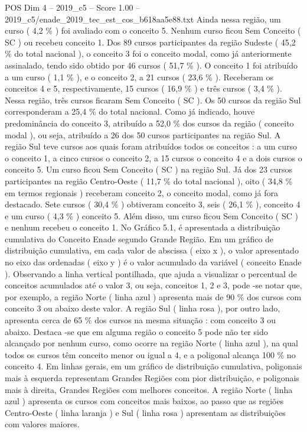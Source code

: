 \begin{textsample}{POS Dim 4 – 2019\_c5 – Score 1.00 – 2019\_c5/enade\_2019\_tec\_est\_cos\_b618aa5e88.txt}
Ainda nessa região, um curso ( 4,2 \% ) foi avaliado com o conceito 5.
Nenhum curso ficou Sem Conceito ( SC ) ou recebeu conceito 1.
Dos 89 cursos participantes da região Sudeste ( 45,2 \% do total nacional ), o conceito 3 foi o conceito modal, como já anteriormente assinalado, tendo sido obtido por 46 cursos ( 51,7 \% ).
O conceito 1 foi atribuído a um curso ( 1,1 \% ), e o conceito 2, a 21 cursos ( 23,6 \% ).
Receberam os conceitos 4 e 5, respectivamente, 15 cursos ( 16,9 \% ) e três cursos ( 3,4 \% ).
Nessa região, três cursos ficaram Sem Conceito ( SC ).
Os 50 cursos da região Sul corresponderam a 25,4 \% do total nacional.
Como já indicado, houve predominância do conceito 3, atribuído a 52,0 \% dos cursos da região ( conceito modal ), ou seja, atribuído a 26 dos 50 cursos participantes na região Sul.
A região Sul teve cursos aos quais foram atribuídos todos os conceitos : a um curso o conceito 1, a cinco cursos o conceito 2, a 15 cursos o conceito 4 e a dois cursos o conceito 5.
Um curso ficou Sem Conceito ( SC ) na região Sul.
Já dos 23 cursos participantes na região Centro-Oeste ( 11,7 \% do total nacional ), oito ( 34,8 \% em termos regionais ) receberam conceito 2, o conceito modal, como já fora destacado.
Sete cursos ( 30,4 \% ) obtiveram conceito 3, seis ( 26,1 \% ), conceito 4 e um curso ( 4,3 \% ) conceito 5.
Além disso, um curso ficou Sem Conceito ( SC ) e nenhum recebeu o conceito 1.
No Gráfico 5.1, é apresentada a distribuição cumulativa do Conceito Enade segundo Grande Região.
Em um gráfico de distribuição cumulativa, em cada valor de abscissa ( eixo x ), o valor apresentado no eixo das ordenadas ( eixo y ) é o valor acumulado da variável ( conceito Enade ).
Observando a linha vertical pontilhada, que ajuda a visualizar o percentual de conceitos acumulados até o valor 3, ou seja, conceitos 1, 2 e 3, pode -se notar que, por exemplo, a região Norte ( linha azul ) apresenta mais de 90 \% dos cursos com conceito 3 ou abaixo deste valor.
A região Sul ( linha rosa ), por outro lado, apresenta cerca de 65 \% dos cursos na mesma situação : com conceito 3 ou abaixo.
Destaca -se que em alguma região o conceito 5 pode não ter sido alcançado por nenhum curso, como ocorre na região Norte ( linha azul ), na qual todos os cursos têm conceito menor ou igual a 4, e a poligonal alcança 100 \% no conceito 4.
Em linhas gerais, em um gráfico de distribuição cumulativa, poligonais mais à esquerda representam Grandes Regiões com pior distribuição, e poligonais mais à direita, Grandes Regiões com melhores conceitos.
A região Norte ( linha azul ) apresenta os cursos com conceitos mais baixos, ao passo que as regiões Centro-Oeste ( linha laranja ) e Sul ( linha rosa ) apresentam as distribuições com valores maiores.

\end{textsample}
